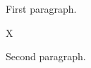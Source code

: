 \documentclass{article}
\begin{document}
First paragraph.

\makeatletter\begin{minipage}{5cm}\def\@captype{figure}X \caption{Mini \lxmbf\ cap}\end{minipage}\makeatother

Second paragraph.
\end{document}
